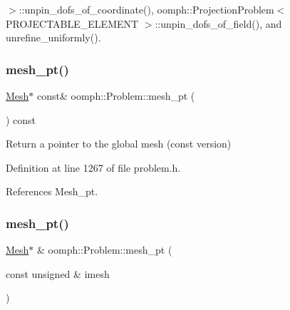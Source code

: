 $>$\+::unpin\+\_\+dofs\+\_\+of\+\_\+coordinate(), oomph\+::\+Projection\+Problem$<$ P\+R\+O\+J\+E\+C\+T\+A\+B\+L\+E\+\_\+\+E\+L\+E\+M\+E\+N\+T $>$\+::unpin\+\_\+dofs\+\_\+of\+\_\+field(), and unrefine\+\_\+uniformly().

\mbox{\label{classoomph_1_1Problem_a3a2e53542288a4140ea5b076ffa648db}} 
\subsubsection{\texorpdfstring{mesh\+\_\+pt()}{mesh\_pt()}\hspace{0.1cm}{\footnotesize\ttfamily [2/4]}}
{\footnotesize\ttfamily \hyperlink{classoomph_1_1Mesh}{Mesh}$\ast$ const\& oomph\+::\+Problem\+::mesh\+\_\+pt (\begin{DoxyParamCaption}{ }\end{DoxyParamCaption}) const\hspace{0.3cm}{\ttfamily [inline]}}



Return a pointer to the global mesh (const version) 



Definition at line 1267 of file problem.\+h.



References Mesh\+\_\+pt.

\mbox{\label{classoomph_1_1Problem_a6dafb68ef8d4765978ad5d162ebb61f6}} 
\subsubsection{\texorpdfstring{mesh\+\_\+pt()}{mesh\_pt()}\hspace{0.1cm}{\footnotesize\ttfamily [3/4]}}
{\footnotesize\ttfamily \hyperlink{classoomph_1_1Mesh}{Mesh}$\ast$ \& oomph\+::\+Problem\+::mesh\+\_\+pt (\begin{DoxyParamCaption}\item[{const unsigned \&}]{imesh }\end{DoxyParamCaption})\hspace{0.3cm}{\ttfamily [inline]}}



